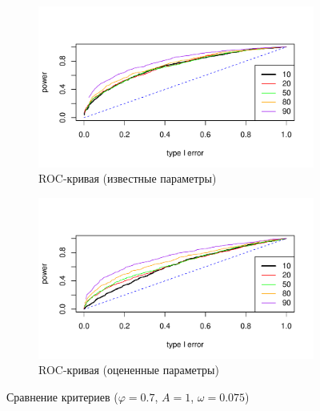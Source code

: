 \documentclass[specialist,
substylefile = spbu.rtx,
               subf,href,colorlinks=true, 12pt]{disser}
\theoremstyle{definition}
\begin{document}
\begin{figure}[h!]
\begin{subfigure}[t]{0.5\textwidth}
		\label{fig:type1error_phi7est}
	\end{subfigure}
	\bigskip
	\begin{subfigure}[t]{0.5\textwidth}
		\centering
		\includegraphics[width=\textwidth]{img/roc_phi7_omega0075.pdf}
		\caption{ROC-кривая (известные параметры)}
		\label{fig:roc_phi7_omega0075}
	\end{subfigure}\hspace{\fill}
	\begin{subfigure}[t]{0.5\textwidth}
		\centering
		\includegraphics[width=\textwidth]{img/roc_phi7est_omega0075.pdf}
		\caption{ROC-кривая (оцененные параметры)}
		\label{fig:roc_phi7est_omega0075}
	\end{subfigure}
	\caption{Сравнение критериев ($\varphi=0.7$, $A=1$, $\omega=0.075$)}
	\label{fig:est_comp}
\end{figure}
\end{document}
